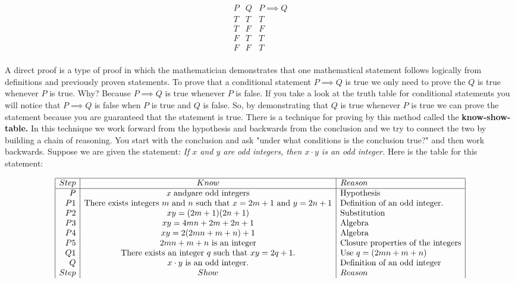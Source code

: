 \documentclass[10pt]{amsbook}
\begin{document}
\begin{center}
    \[
\begin{array}{r|c|l} 
P & Q & P \implies Q\\
\hline
T & T & T\\
T & F & F\\
F & T & T\\
F & F & T\\
\end{array}
\]
\end{center}
A direct proof is a type of proof in which the mathematician demonstrates that one mathematical statement follows logically from definitions and previously proven statements. To prove that a conditional statement $P \implies Q$ is true we only need to prove the $Q$ is true whenever $P$ is true. Why? Because $P\implies Q$ is true whenever $P$ is false. If you take a look at the truth table for conditional statements you will notice that $P \implies Q$ is false when $P$ is true and $Q$ is false. So, by demonstrating that $Q$ is true whenever $P$ is true we can prove the statement because you are guaranteed that the statement is true. There is a technique for proving by this method called the \textbf{know-show-table.} In this technique we work forward from the hypothesis and backwards from the conclusion and we try to connect the two by building a chain of reasoning. You start with the conclusion and ask "under what conditions is the conclusion true?" and then work backwards. Suppose  we are given the statement: \textit{If $x$ and $y$ are odd integers, then $x \cdot y$ is an odd integer.} Here is the table for this statement:

\begin{center}
    \[
\begin{array}{|r|c|l|} \hline
Step & Know & Reason\\
\hline
P & x\hspace{.1cm} \text{and} y \text{are odd integers} & \text{Hypothesis}\\
P1 & \text{There exists integers $m$ and $n$ such that $x = 2m + 1$ and $y = 2n + 1$}  & \text{Definition of an odd integer.} \\
P2 & xy = (2m + 1)(2n + 1) & \text{Substitution}\\
P3 & xy = 4mn + 2m + 2n + 1 & \text{Algebra} \\
P4 & xy = 2(2mn + m + n) + 1 & \text{Algebra}\\
P5 & \text{$2mn + m + n$ is an integer} & \text{Closure properties of the integers}\\
Q1 & \text{There exists an integer $q$ such that $xy = 2q + 1.$}  & \text{Use $q = (2mn + m + n)$}\\
Q & \text{$ x \cdot y$ is an odd integer.} & \text{Definition of an odd integer}\\
Step & Show & Reason
\end{array}
\]
\end{center}
\end{document}
